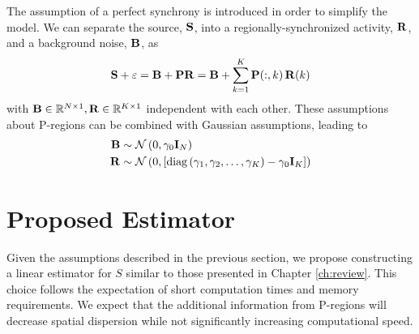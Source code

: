 The assumption of a perfect synchrony is introduced in order to simplify the model.
%
We can separate the source, $\mathbf{S}$, into a regionally-synchronized activity, $\mathbf{R}$, and a background noise, $\mathbf{B}$, as
\begin{equation}
    \mathbf{S} +\varepsilon = \mathbf{B} + \mathbf{P} \mathbf{R} = \mathbf{B} + \sum_{k=1}^K \mathbf{P}(:,k)\, \mathbf{R}(k)
    \label{eq:3.4}
\end{equation}
with $\mathbf{B} \in \mathbb{R}^{N\times 1}, \mathbf{R} \in \mathbb{R}^{K\times 1}$ independent with each other.
%
These assumptions about P-regions can be combined with Gaussian assumptions, leading to 
\begin{align}
    \mathbf{B} &\sim \mathcal{N}\left( 0, \gamma_0 \mathbf{I}_N  \right) 
    \label{eq:3.5} \\
    \mathbf{R} &\sim \mathcal{N}\left( 0, 
    \left[ \text{diag}\left( \gamma_1, \gamma_2, \dots, \gamma_K \right)-\gamma_0 \mathbf{I}_K \right]  \right)
    \label{eq:3.6}
\end{align}


\section{Proposed Estimator}

Given the assumptions described in the previous section, we propose constructing a linear estimator for $S$ similar to those presented in Chapter \ref{ch:review}.
%
%
This choice follows the expectation of short computation times and memory requirements. 
%
We expect that the additional information from P-regions will decrease spatial dispersion while not significantly increasing computational speed.


